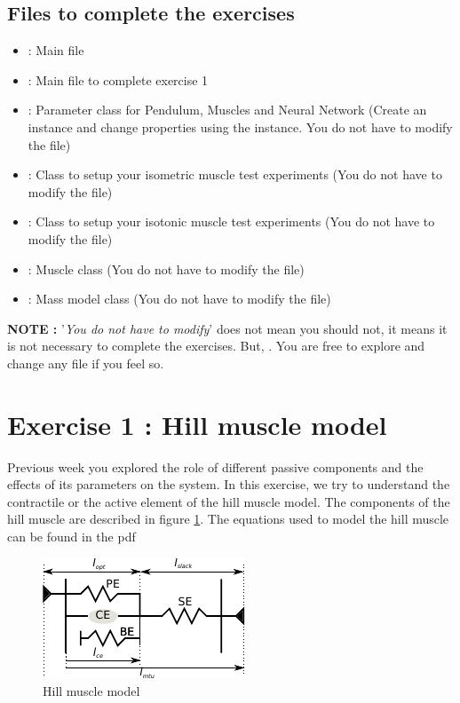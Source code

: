\documentclass{cmc}
\begin{document}
\subsection*{Files to complete the exercises}
\label{sec:intro}

\begin{itemize}
\item {} : Main file
\item {} : Main file to complete exercise 1
\item {} : Parameter class for Pendulum,
  Muscles and Neural Network (Create an instance and change properties
  using the instance. You do not have to modify the file)
\item {} : Class to setup your isometric
  muscle test experiments (You do not have to modify the file)
\item {} : Class to setup your isotonic
  muscle test experiments (You do not have to modify the file)
\item {} : Muscle class (You do not have to modify
  the file)
\item {} : Mass model class (You do not have to modify
  the file)
\end{itemize}

\textbf{NOTE : } '\textit{You do not have to modify}' does not mean
you should not, it means it is not necessary to complete the
exercises. But, . You are free to explore
and change any file if you feel so.


\section*{Exercise 1 : Hill muscle model}
\label{sec:question-2}

Previous week you explored the role of different passive components
and the effects of its parameters on the system. In this exercise, we
try to understand the contractile or the active element of the hill
muscle model. The components of the hill muscle are described in
figure \ref{fig:hill_muscle}. The equations used to model the hill
muscle can be found in the pdf 

\begin{figure}[H]
  \centering \includegraphics[scale=2.5]{figures/hill_muscle}
  \caption{Hill muscle model}
  \label{fig:hill_muscle}
\end{figure}
\end{document}
